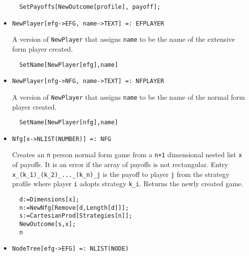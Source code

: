 \begin{itemize}
\begin{verbatim}
  SetPayoffs[NewOutcome[profile], payoff];
\end{verbatim} 
\ed


\item{}
\protect \large \begin{verbatim}
NewPlayer[efg->EFG, name->TEXT] =: EFPLAYER 
\end{verbatim}\normalsize

\bd 
A version of \verb+NewPlayer+ that assigns \verb+name+ to be the name
of the extensive form player created.  
\begin{verbatim}
  SetName[NewPlayer[efg],name]
\end{verbatim} 
\ed

\item{}
\protect \large \begin{verbatim}
NewPlayer[nfg->NFG, name->TEXT] =: NFPLAYER 
\end{verbatim}\normalsize

\bd 
A version of \verb+NewPlayer+ that assigns \verb+name+ to be the name
of the normal form player created.  
\begin{verbatim}
  SetName[NewPlayer[nfg],name]
\end{verbatim} 
\ed

\item{}
\protect \large \begin{verbatim}
Nfg[x->NLIST(NUMBER)] =: NFG 
\end{verbatim}\normalsize

\bd 

Creates an \verb+n+ person normal form game from a \verb&n+1&
dimensional nested list \verb+x+ of payoffs.  It is an error if the
array of payoffs is not rectangular.  Entry
\verb+x_(k_1)_(k_2)_..._(k_n)_j+ is the payoff to player \verb+j+ from
the strategy profile where player \verb+i+ adopts strategy \verb+k_i+.
Returns the newly created game.

\begin{verbatim}
  d:=Dimensions[x];
  n:=NewNfg[Remove[d,Length[d]]];
  s:=CartesianProd[Strategies[n]];
  NewOutcome[s,x];
  n
\end{verbatim} 
\ed

\item{}
\protect \large \begin{verbatim}
NodeTree[efg->EFG] =: NLIST(NODE) 
\end{verbatim}\normalsize


\end{itemize}
